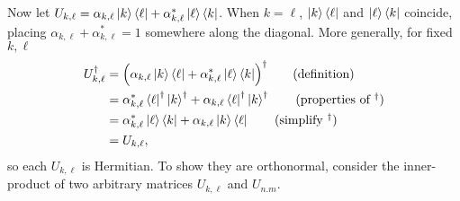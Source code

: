 \noindent Now let $U_{k,\ell} = \alpha_{k,\ell}\ket{k}\bra{\ell}+\alpha_{k,\ell}^*\ket{\ell}\bra{k}$.  When $k=\ell$, $\ket{k}\bra{\ell}$ and $\ket{\ell}\bra{k}$ coincide, placing $ \alpha_{k,\ell}+\alpha_{k,\ell}^* = 1$ somewhere along the diagonal.  More generally, for fixed $k, \ell$
\begin{align*}
U_{k,\ell}^\dagger &= \Bigl( \alpha_{k,\ell}\ket{k}\bra{\ell}+\alpha_{k,\ell}^*\ket{\ell}\bra{k}\Bigr)^\dagger \tag{definition}\\
&=  \alpha_{k,\ell}^*\bra{\ell}^{\dagger}\ket{k}^\dagger + \alpha_{k,\ell}\bra{\ell}^\dagger\ket{k}^\dagger \tag{properties of $^\dagger$} \\
&= \alpha_{k,\ell}^*\ket{\ell}\bra{k} + \alpha_{k,\ell}\ket{k}\bra{\ell} \tag{simplify $^\dagger$}\\
&= U_{k,\ell},
\end{align*}
so each $U_{k,\ell}$ is Hermitian.  To show they are orthonormal, consider the inner-product of two arbitrary matrices $U_{k,\ell}$ and $U_{n.m}$.
\begingroup
\allowdisplaybreaks
